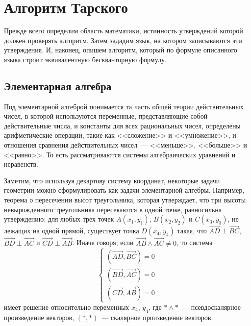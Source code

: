 \section{Алгоритм Тарского}

Прежде всего определим область математики, истинность утверждений которой должен проверять алгоритм. Затем зададим язык, на котором записываются эти утверждения. И, наконец, опишем алгоритм, который по формуле описанного языка строит эквивалентную бескванторную формулу.

\subsection{Элементарная алгебра}

Под элементарной алгеброй понимается та часть общей теории действительных чисел, в которой используются переменные, представляющие собой действительные числа, и константы для всех рациональных чисел, определены арифметические операции, такие как <<сложение>> и <<умножение>>, и отношения сравнения действительных чисел~--- <<меньше>>, <<больше>> и <<равно>>. То есть рассматриваются системы алгебраических уравнений и неравенств.

Заметим, что используя декартову систему координат, некоторые задачи геометрии можно сформулировать как задачи элементарной алгебры. Например, теорема о пересечении высот треугольника, которая утверждает, что три высоты невырожденного треугольника пересекаются в одной точке, равносильна утверждению: для любых трех точек $A(x_1, y_1)$, $B(x_2, y_2)$ и $C(x_3, y_3)$, не лежащих на одной прямой, существует точка $D(x_4, y_4)$ такая, что $\overrightarrow{AD} \perp \overrightarrow{BC}$, $\overrightarrow{BD} \perp \overrightarrow{AC}$ и $\overrightarrow{CD} \perp \overrightarrow{AB}$. Иначе говоря, если $\overrightarrow{AB} \land \overrightarrow{AC} \neq 0$, то система
\begin{equation*}
    \begin{cases}
        \left(\overrightarrow{AD}, \overrightarrow{BC}\right) = 0 \\
        \left(\overrightarrow{BD}, \overrightarrow{AC}\right) = 0 \\
        \left(\overrightarrow{CD}, \overrightarrow{AB}\right) = 0
    \end{cases}
\end{equation*}
имеет решение относительно переменных $x_4$, $y_4$, где $* \land *$~--- псевдоскалярное произведение векторов, $(*, *)$~--- скалярное произведение векторов.

